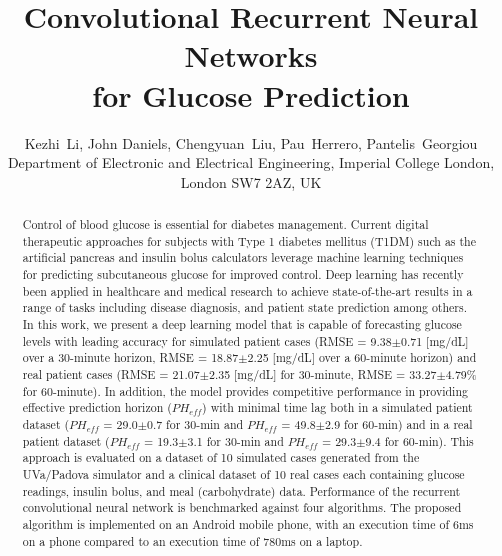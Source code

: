 \documentclass[a4paper, 10 pt, twocolumn]{IEEEtran}
\begin{document}
\title{Convolutional Recurrent Neural Networks \\ for Glucose Prediction}
\author{Kezhi~Li, John Daniels, Chengyuan~Liu,  Pau~Herrero, Pantelis~Georgiou\\
Department of Electronic and Electrical Engineering, Imperial College London, London SW7 2AZ, UK\\

}

\maketitle

\begin{abstract}
Control of blood glucose is essential for diabetes management. Current digital therapeutic approaches for subjects with Type 1 diabetes mellitus (T1DM) such as the artificial pancreas and insulin bolus calculators
leverage machine learning techniques for predicting subcutaneous glucose for improved control. Deep learning has recently been applied in healthcare and medical research to achieve state-of-the-art results in a range of
tasks including disease diagnosis, and patient state prediction among others. In this work, we present a deep learning model that is capable of forecasting glucose levels with leading accuracy for simulated patient
cases (RMSE = 9.38$\pm$0.71 [mg/dL] over a 30-minute horizon, RMSE = 18.87$\pm$2.25 [mg/dL] over a 60-minute horizon) and real patient cases (RMSE = 21.07$\pm$2.35 [mg/dL] for 30-minute, RMSE = 33.27$\pm$4.79\% for
60-minute). In addition, the model provides competitive performance in providing effective prediction horizon ($PH_{eff}$) with minimal time lag both in a simulated patient dataset ($PH_{eff}$ = 29.0$\pm$0.7 for 30-min
and $PH_{eff}$ = 49.8$\pm$2.9 for 60-min) and in a real patient dataset ($PH_{eff}$ = 19.3$\pm$3.1 for 30-min and $PH_{eff}$ = 29.3$\pm$9.4 for 60-min). This approach is evaluated on a dataset of 10 simulated cases
generated from the UVa/Padova simulator and a clinical dataset of 10 real cases each containing glucose readings, insulin bolus, and meal (carbohydrate) data. Performance of the recurrent convolutional neural network is
benchmarked against four algorithms. The proposed algorithm is implemented on an Android mobile phone, with an execution time of $6$ms on a phone compared to an execution time of $780$ms on a laptop.
\end{abstract}
\end{document}
